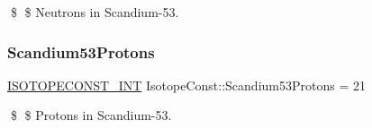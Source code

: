 \$ \$ Neutrons in Scandium-\/53. \mbox{\label{group___isotope_const-_scandium-_sc53_gab24b55b86e57e4002ee8656103c43815}} 
\subsubsection{\texorpdfstring{Scandium53\+Protons}{Scandium53Protons}}
{\footnotesize\ttfamily \mbox{\hyperlink{group___isotope_const-_macros_ga5f18360b3e99483a35c32d789e62621c}{I\+S\+O\+T\+O\+P\+E\+C\+O\+N\+S\+T\+\_\+\+I\+NT}} Isotope\+Const\+::\+Scandium53\+Protons = 21}

\$ \$ Protons in Scandium-\/53. 